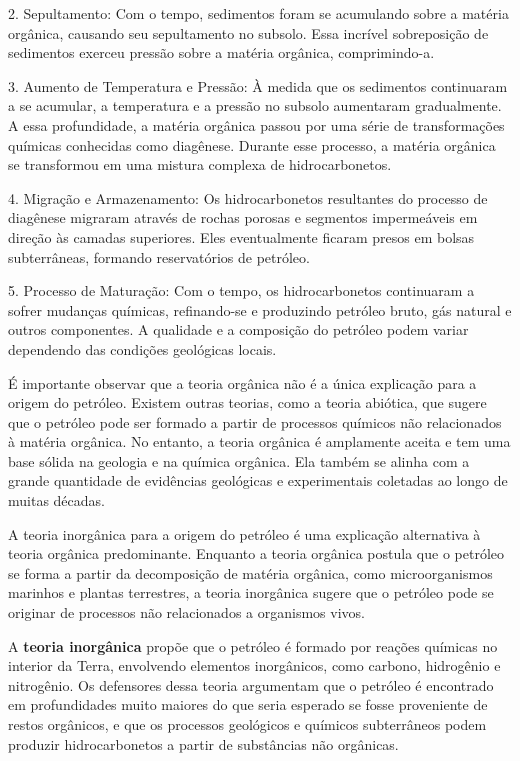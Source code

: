 2. Sepultamento: Com o tempo, sedimentos foram se acumulando sobre a matéria orgânica, causando seu sepultamento no subsolo. Essa incrível sobreposição de sedimentos exerceu pressão sobre a matéria orgânica, comprimindo-a.

3. Aumento de Temperatura e Pressão: À medida que os sedimentos continuaram a se acumular, a temperatura e a pressão no subsolo aumentaram gradualmente. A essa profundidade, a matéria orgânica passou por uma série de transformações químicas conhecidas como diagênese. Durante esse processo, a matéria orgânica se transformou em uma mistura complexa de hidrocarbonetos.

4. Migração e Armazenamento: Os hidrocarbonetos resultantes do processo de diagênese migraram através de rochas porosas e segmentos impermeáveis em direção às camadas superiores. Eles eventualmente ficaram presos em bolsas subterrâneas, formando reservatórios de petróleo.

5. Processo de Maturação: Com o tempo, os hidrocarbonetos continuaram a sofrer mudanças químicas, refinando-se e produzindo petróleo bruto, gás natural e outros componentes. A qualidade e a composição do petróleo podem variar dependendo das condições geológicas locais.

É importante observar que a teoria orgânica não é a única explicação para a origem do petróleo. Existem outras teorias, como a teoria abiótica, que sugere que o petróleo pode ser formado a partir de processos químicos não relacionados à matéria orgânica. No entanto, a teoria orgânica é amplamente aceita e tem uma base sólida na geologia e na química orgânica. Ela também se alinha com a grande quantidade de evidências geológicas e experimentais coletadas ao longo de muitas décadas.

A teoria inorgânica para a origem do petróleo é uma explicação alternativa à teoria orgânica predominante. Enquanto a teoria orgânica postula que o petróleo se forma a partir da decomposição de matéria orgânica, como microorganismos marinhos e plantas terrestres, a teoria inorgânica sugere que o petróleo pode se originar de processos não relacionados a organismos vivos.

A \textbf{teoria inorgânica} propõe que o petróleo é formado por reações químicas no interior da Terra, envolvendo elementos inorgânicos, como carbono, hidrogênio e nitrogênio. Os defensores dessa teoria argumentam que o petróleo é encontrado em profundidades muito maiores do que seria esperado se fosse proveniente de restos orgânicos, e que os processos geológicos e químicos subterrâneos podem produzir hidrocarbonetos a partir de substâncias não orgânicas.

